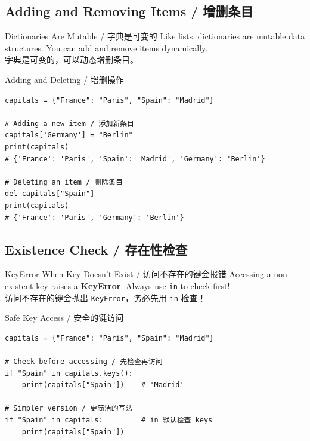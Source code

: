 \documentclass[11pt,a4paper]{article}
\begin{document}
\subsection{Adding and Removing Items / 增删条目}

\begin{concept}{Dictionaries Are Mutable / 字典是可变的}
    Like lists, dictionaries are mutable data structures. You can add and remove items dynamically. \\
    字典是可变的，可以动态增删条目。
\end{concept}

\begin{examplebox}{Adding and Deleting / 增删操作}
\begin{lstlisting}
capitals = {"France": "Paris", "Spain": "Madrid"}

# Adding a new item / 添加新条目
capitals['Germany'] = "Berlin"
print(capitals)
# {'France': 'Paris', 'Spain': 'Madrid', 'Germany': 'Berlin'}

# Deleting an item / 删除条目
del capitals["Spain"]
print(capitals)
# {'France': 'Paris', 'Germany': 'Berlin'}
\end{lstlisting}
\end{examplebox}

\subsection{Existence Check / 存在性检查}

\begin{warning}{KeyError When Key Doesn't Exist / 访问不存在的键会报错}
    Accessing a non-existent key raises a \textbf{KeyError}. Always use \texttt{in} to check first! \\
    访问不存在的键会抛出 \texttt{KeyError}，务必先用 \texttt{in} 检查！
\end{warning}

\begin{examplebox}{Safe Key Access / 安全的键访问}
\begin{lstlisting}
capitals = {"France": "Paris", "Spain": "Madrid"}

# Check before accessing / 先检查再访问
if "Spain" in capitals.keys():
    print(capitals["Spain"])    # 'Madrid'

# Simpler version / 更简洁的写法
if "Spain" in capitals:         # in 默认检查 keys
    print(capitals["Spain"])
\end{lstlisting}
\end{examplebox}
\end{document}
